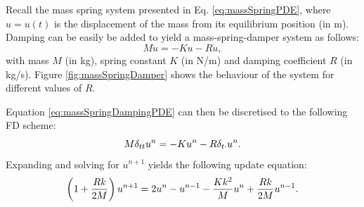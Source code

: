 Recall the mass spring system presented in Eq. \eqref{eq:massSpringPDE}, where $u=u(t)$ is the displacement of the mass from its equilibrium position (in m). Damping can be easily be added to yield a mass-spring-damper system as follows:
\begin{equation}\label{eq:massSpringDampingPDE}
    M\ddot u = -Ku - R\dot u,
\end{equation}
with mass $M$ (in kg), spring constant $K$ (in N/m) and damping coefficient $R$ (in kg/s). Figure \ref{fig:massSpringDamper} shows the behaviour of the system for different values of $R$. 

Equation \eqref{eq:massSpringDampingPDE} can then be discretised to the following FD scheme:
\begin{equation}\label{eq:massSpringDampingFDS}
    M\delta_{tt} u^n = -Ku^n - R\delta_{t\cdot} u^n.
\end{equation}
Expanding and solving for $u^{n+1}$ yields the following update equation:
\begin{equation}\label{eq:massSpringDampingUpdate}
    \left(1+\frac{Rk}{2M}\right)u^{n+1} = 2 u^n - u^{n-1} - \frac{Kk^2}{M}u^n + \frac{Rk}{2M}u^{n-1}.
\end{equation}

